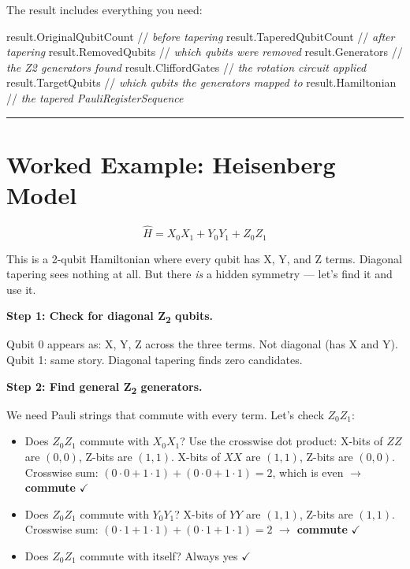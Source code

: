 \documentclass[
  11pt,
  oneside]{book}
\newenvironment{Shaded}{\begin{snugshade}}{\end{snugshade}}
\newcommand{\CommentTok}[1]{\textcolor[rgb]{0.56,0.35,0.01}{\textit{#1}}}
\newcommand{\NormalTok}[1]{#1}
\providecommand{\tightlist}{%
  \setlength{\itemsep}{0pt}\setlength{\parskip}{0pt}}
\begin{document}
The result includes everything you need:

\begin{Shaded}
\begin{Highlighting}[]
\NormalTok{result.OriginalQubitCount  //}\CommentTok{ before tapering}
\NormalTok{result.TaperedQubitCount   //}\CommentTok{ after tapering}
\NormalTok{result.RemovedQubits       //}\CommentTok{ which qubits were removed}
\NormalTok{result.Generators          //}\CommentTok{ the Z2 generators found}
\NormalTok{result.CliffordGates       //}\CommentTok{ the rotation circuit applied}
\NormalTok{result.TargetQubits        //}\CommentTok{ which qubits the generators mapped to}
\NormalTok{result.Hamiltonian         //}\CommentTok{ the tapered PauliRegisterSequence}
\end{Highlighting}
\end{Shaded}

\begin{center}\rule{0.5\linewidth}{0.5pt}\end{center}

\section{Worked Example: Heisenberg
Model}\label{worked-example-heisenberg-model}

\[\hat{H} = X_0X_1 + Y_0Y_1 + Z_0Z_1\]

This is a 2-qubit Hamiltonian where every qubit has X, Y, and Z terms.
Diagonal tapering sees nothing at all. But there \emph{is} a hidden
symmetry --- let's find it and use it.

\textbf{Step 1: Check for diagonal Z\textsubscript{2} qubits.}

Qubit 0 appears as: X, Y, Z across the three terms. Not diagonal (has X
and Y). Qubit 1: same story. Diagonal tapering finds zero candidates.

\textbf{Step 2: Find general Z\textsubscript{2} generators.}

We need Pauli strings that commute with every term. Let's check
\(Z_0 Z_1\):

\begin{itemize}
\tightlist
\item
  Does \(Z_0 Z_1\) commute with \(X_0 X_1\)? Use the crosswise dot
  product: X-bits of \(ZZ\) are \((0,0)\), Z-bits are \((1,1)\). X-bits
  of \(XX\) are \((1,1)\), Z-bits are \((0,0)\). Crosswise sum:
  \((0 \cdot 0 + 1 \cdot 1) + (0 \cdot 0 + 1 \cdot 1) = 2\), which is
  even $\rightarrow$ \textbf{commute} $\checkmark$
\item
  Does \(Z_0 Z_1\) commute with \(Y_0 Y_1\)? X-bits of \(YY\) are
  \((1,1)\), Z-bits are \((1,1)\). Crosswise sum:
  \((0 \cdot 1 + 1 \cdot 1) + (0 \cdot 1 + 1 \cdot 1) = 2\) $\rightarrow$
  \textbf{commute} $\checkmark$
\item
  Does \(Z_0 Z_1\) commute with itself? Always yes $\checkmark$
\end{itemize}
\end{document}
